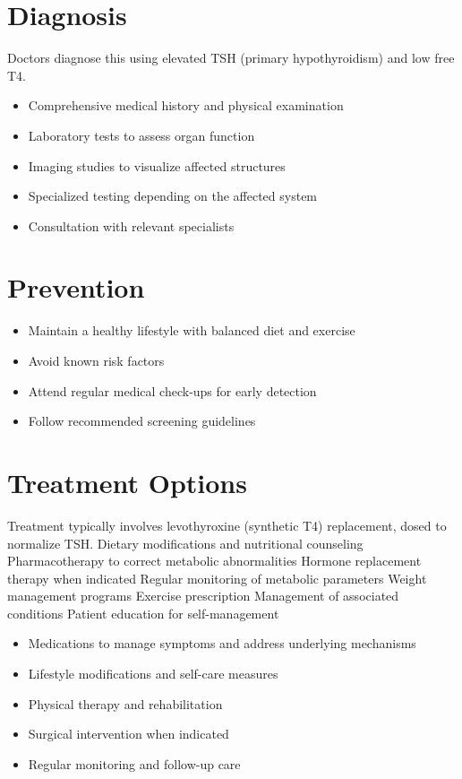 \section{Diagnosis}
Doctors diagnose this using elevated TSH (primary hypothyroidism) and low free T4.

\begin{itemize}[noitemsep]
  \item Comprehensive medical history and physical examination
  \item Laboratory tests to assess organ function
  \item Imaging studies to visualize affected structures
  \item Specialized testing depending on the affected system
  \item Consultation with relevant specialists
\end{itemize}
\section{Prevention}
\begin{itemize}[noitemsep]
  \item Maintain a healthy lifestyle with balanced diet and exercise
  \item Avoid known risk factors
  \item Attend regular medical check-ups for early detection
  \item Follow recommended screening guidelines
\end{itemize}
\section{Treatment Options}
Treatment typically involves levothyroxine (synthetic T4) replacement, dosed to normalize TSH. Dietary modifications and nutritional counseling Pharmacotherapy to correct metabolic abnormalities Hormone replacement therapy when indicated Regular monitoring of metabolic parameters Weight management programs Exercise prescription Management of associated conditions Patient education for self-management

\begin{itemize}[noitemsep]
  \item Medications to manage symptoms and address underlying mechanisms
  \item Lifestyle modifications and self-care measures
  \item Physical therapy and rehabilitation
  \item Surgical intervention when indicated
  \item Regular monitoring and follow-up care
\end{itemize}
